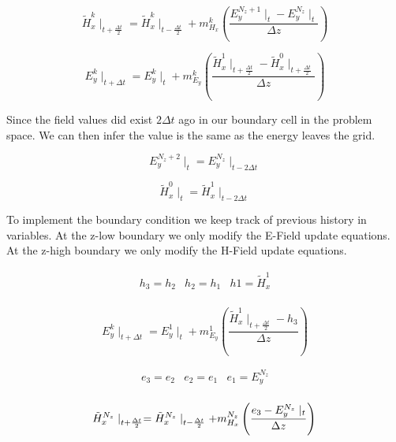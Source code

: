 \documentclass[a4paper,10pt]{article}
\begin{document}
\begin{equation}
  \label{eq:PerfectboundaryH}
  \tilde{H}_{x}^{k}\mid_{t+\frac{\Delta t}{2}} = \tilde{H}_{x}^{k}\mid_{t-\frac{\Delta t}{2}} + m_{H_x}^{k}\left(\frac{E_{y}^{N_z+1}\mid_{t} - E_{y}^{N_z}\mid_{t}}{\Delta z}\right)
\end{equation}

\begin{equation}
  \label{eq:PerfectboundaryE}
  E_{y}^{k}\mid_{t+\Delta t} = E_{y}^{k}\mid_{t} + m_{E_y}^{k}\left(\frac{\tilde{H}_{x}^{1}\mid_{t+\frac{\Delta t}{2}} - \tilde{H}_{x}^{0}\mid_{t+\frac  {\Delta t}{2}}}{\Delta z}\right)
\end{equation}

Since the field values did exist $2\Delta t$ ago in our boundary cell in the problem space.  We can then infer the value is the same as the energy leaves the grid.

\begin{equation*}
  E_y^{N_z + 2}\mid_{t} = E_y^{N_z}\mid_{t-2\Delta t}
\end{equation*}

\begin{equation*}
 \tilde{H}_{x}^{0}\mid_{t} = \tilde{H}_{x}^{1}\mid_{t-2\Delta t}
\end{equation*}

To implement the boundary condition we keep track of previous history in variables.  At the z-low boundary we only modify the E-Field update equations.  At the z-high boundary we only modify the H-Field update equations.


\begin{eqnarray*}
  h_3 = h_2 & h_2 = h_1 & h1 = \tilde{H}_{x}^{1}\\
\end{eqnarray*}

\begin{equation*}
   E_{y}^{k}\mid_{t+\Delta t} = E_{y}^{1}\mid_{t} + m_{E_y}^{1}\left(\frac{\tilde{H}_{x}^{1}\mid_{t+\frac{\Delta t}{2}} - h_3 }{\Delta z}\right)
\end{equation*}


\begin{eqnarray*}
  e_3 = e_2 & e_2 = e_1 & e_1 = E_y^{N_z}\\
\end{eqnarray*}

\begin{equation*}
   \tilde{H}_{x}^{N_z}\mid_{t+\frac{\Delta t}{2}} = \tilde{H}_{x}^{N_z}\mid_{t-\frac{\Delta t}{2}} + m_{H_x}^{N_z}\left(\frac{e_3 - E_{y}^{N_z}\mid_{t}}{\Delta z}\right)\\
\end{equation*}
\end{document}
